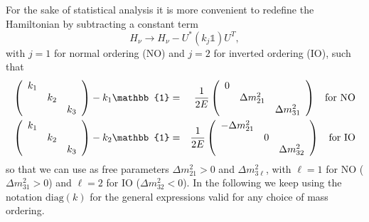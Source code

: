 \documentclass{article}
\begin{document}
For the sake of statistical analysis it is more convenient to redefine the Hamiltonian by subtracting a constant term
\begin{equation}
	H_\nu \rightarrow H_\nu - U^* \left(k_j \mathbb{1}\right) U^T,
\end{equation}
with $j=1$ for normal ordering (NO) and $j=2$ for inverted ordering (IO), such that
\begin{eqnarray}
	\left(\begin{array}{ccc}
k_1 &&\\
& k_2 & \\
&& k_3 	
\end{array} \right) - k_1 \mathbb{1} &=& \frac{1}{2E} \left( \begin{array}{ccc}
 0 && \\
 & \Delta m_{21}^2 & \\
 && \Delta m_{31}^2	
 \end{array} \right) \hspace{0.2cm} \text{ for NO} \label{eq:kinetic_NO}\\
	\left(\begin{array}{ccc}
k_1 &&\\
& k_2 & \\
&& k_3 	
\end{array} \right) - k_2 \mathbb{1} &=& \frac{1}{2E} \left( \begin{array}{ccc}
 - \Delta m_{21}^2 && \\
 & 0 & \\
 && \Delta m_{32}^2	
 \end{array} \right) \hspace{0.2cm} \text{ for IO} \label{eq:kinetic_IO}
\end{eqnarray}
so that we can use as free parameters $\Delta m_{21}^2 >0$ and $\Delta m_{3\ell}^2$, with $\ell=1$ for NO ($\Delta m_{31}^2 > 0$) and $\ell=2$ for IO ($\Delta m_{32}^2 < 0$). In the following we keep using the notation $\text{diag}(k)$ for the general expressions valid for any choice of mass ordering.
\end{document}
